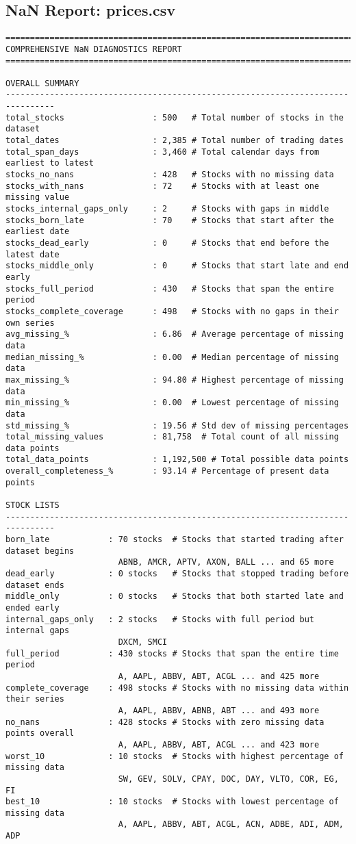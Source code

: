 \documentclass[11pt, letterpaper]{article}
\begin{document}
\subsection{NaN Report: prices.csv}
\begin{verbatim}
================================================================================
COMPREHENSIVE NaN DIAGNOSTICS REPORT
================================================================================

OVERALL SUMMARY
--------------------------------------------------------------------------------
total_stocks                  : 500   # Total number of stocks in the dataset
total_dates                   : 2,385 # Total number of trading dates
total_span_days               : 3,460 # Total calendar days from earliest to latest
stocks_no_nans                : 428   # Stocks with no missing data
stocks_with_nans              : 72    # Stocks with at least one missing value
stocks_internal_gaps_only     : 2     # Stocks with gaps in middle
stocks_born_late              : 70    # Stocks that start after the earliest date
stocks_dead_early             : 0     # Stocks that end before the latest date
stocks_middle_only            : 0     # Stocks that start late and end early
stocks_full_period            : 430   # Stocks that span the entire period
stocks_complete_coverage      : 498   # Stocks with no gaps in their own series
avg_missing_%                 : 6.86  # Average percentage of missing data
median_missing_%              : 0.00  # Median percentage of missing data
max_missing_%                 : 94.80 # Highest percentage of missing data
min_missing_%                 : 0.00  # Lowest percentage of missing data
std_missing_%                 : 19.56 # Std dev of missing percentages
total_missing_values          : 81,758  # Total count of all missing data points
total_data_points             : 1,192,500 # Total possible data points
overall_completeness_%        : 93.14 # Percentage of present data points

STOCK LISTS
--------------------------------------------------------------------------------
born_late            : 70 stocks  # Stocks that started trading after dataset begins
                       ABNB, AMCR, APTV, AXON, BALL ... and 65 more
dead_early           : 0 stocks   # Stocks that stopped trading before dataset ends
middle_only          : 0 stocks   # Stocks that both started late and ended early
internal_gaps_only   : 2 stocks   # Stocks with full period but internal gaps
                       DXCM, SMCI
full_period          : 430 stocks # Stocks that span the entire time period
                       A, AAPL, ABBV, ABT, ACGL ... and 425 more
complete_coverage    : 498 stocks # Stocks with no missing data within their series
                       A, AAPL, ABBV, ABNB, ABT ... and 493 more
no_nans              : 428 stocks # Stocks with zero missing data points overall
                       A, AAPL, ABBV, ABT, ACGL ... and 423 more
worst_10             : 10 stocks  # Stocks with highest percentage of missing data
                       SW, GEV, SOLV, CPAY, DOC, DAY, VLTO, COR, EG, FI
best_10              : 10 stocks  # Stocks with lowest percentage of missing data
                       A, AAPL, ABBV, ABT, ACGL, ACN, ADBE, ADI, ADM, ADP
\end{verbatim}
\end{document}
